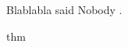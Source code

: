 \documentclass{article}
\begin{document}
Blablabla said Nobody \cite{Nobody06}.

\begin{theorem}
thm
\end{theorem}

{}

\end{document}
